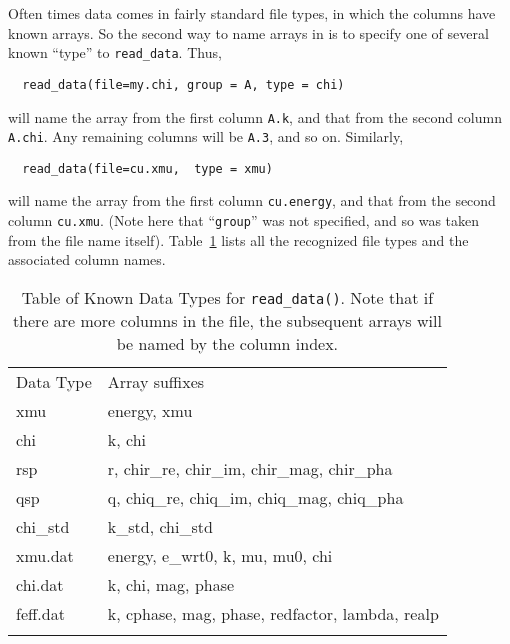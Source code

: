 Often times data comes in fairly standard file types, in which the columns
have known arrays.  So the second way to name arrays in {\ifeffit} is to
specify one of several known ``type'' to {\tt{read\_data}}.  Thus,
\begin{verbatim}
  read_data(file=my.chi, group = A, type = chi)
\end{verbatim}
\noindent
will name the array from the first column {\texttt{A.k}}, and that from the
second column {\texttt{A.chi}}.  Any remaining columns will be
{\texttt{A.3}}, and so on.  Similarly,
\begin{verbatim}
  read_data(file=cu.xmu,  type = xmu)
\end{verbatim}
\noindent
will name the array from the first column {\texttt{cu.energy}}, and that
from the second column {\texttt{cu.xmu}}.  (Note here that ``{\tt{group}}''
was not specified, and so was taken from the file name itself).
Table~{\ref{Table:io_types}} lists all the recognized file types and the
associated column names.
{}

\begin{table}
 \begin{center}
\caption[a]{Table of Known Data Types for {\tt{read\_data()}}. Note that if
there are more columns in the file, the subsequent arrays will be named by
the column index.}
  {\label{Table:io_types}}
\begin{tabular}{ll}
  \noalign{\smallskip}
  Data Type & Array suffixes   \\
 \noalign{\smallskip}    \hline    \noalign{\smallskip}    
  xmu      & energy, xmu \\
  chi      & k, chi   \\
  rsp      & r, chir\_re, chir\_im, chir\_mag, chir\_pha\\
  qsp      & q, chiq\_re, chiq\_im, chiq\_mag, chiq\_pha\\
  chi\_std & k\_std, chi\_std\\
  xmu.dat  & energy, e\_wrt0, k, mu, mu0, chi\\
  chi.dat  & k, chi, mag, phase\\
  feff.dat & k, cphase, mag, phase, redfactor, lambda, realp\\
  \noalign{\smallskip}    \hline
\end{tabular}
\end{center}
\end{table}

